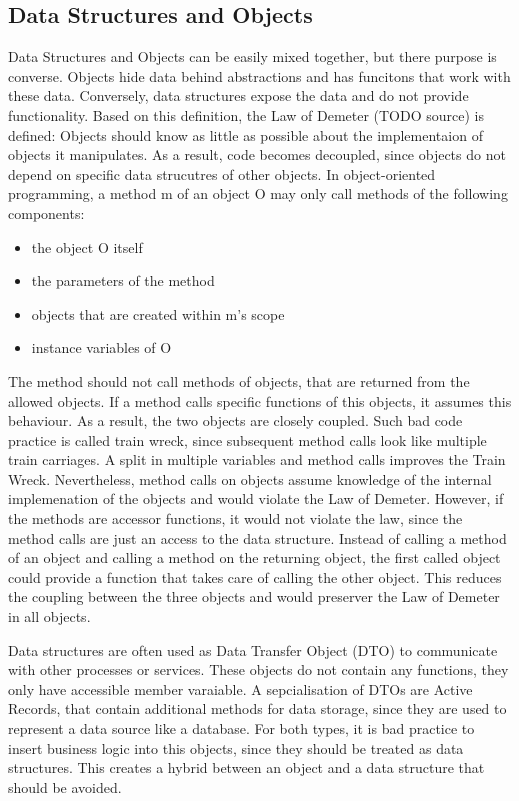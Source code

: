 \subsection{Data Structures and Objects}
Data Structures and Objects can be easily mixed together, but there purpose is converse. Objects hide data behind abstractions and has funcitons that work with these data. Conversely, data structures expose the data and do not provide functionality. Based on this definition, the Law of Demeter (TODO source) is defined: Objects should know as little as possible about the implementaion of objects it manipulates. As a result, code becomes decoupled, since objects do not depend on specific data strucutres of other objects.
In object-oriented programming, a method m of an object O may only call methods of the following components:
\begin{itemize}
    \item the object O itself
    \item the parameters of the method
    \item objects that are created within m's scope
    \item instance variables of O
\end{itemize}
The method should not call methods of objects, that are returned from the allowed objects. If a method calls specific functions of this objects, it assumes this behaviour. As a result, the two objects are closely coupled. 
Such bad code practice is called train wreck, since subsequent method calls look like multiple train carriages. A split in multiple variables and method calls improves the Train Wreck. Nevertheless, method calls on objects assume knowledge of the internal implemenation of the objects and would violate the Law of Demeter. However, if the methods are accessor functions, it would not violate the law, since the method calls are just an access to the data structure. Instead of calling a method of an object and calling a method on the returning object, the first called object could provide a function that takes care of calling the other object. This reduces the coupling between the three objects and would preserver the Law of Demeter in all objects.

Data structures are often used as Data Transfer Object (DTO) to communicate with other processes or services. These objects do not contain any functions, they only have accessible member varaiable. A sepcialisation of DTOs are Active Records, that contain additional methods for data storage, since they are used to represent a data source like a database. For both types, it is bad practice to insert business logic into this objects, since they should be treated as data structures. This creates a hybrid between an object and a data structure that should be avoided.

